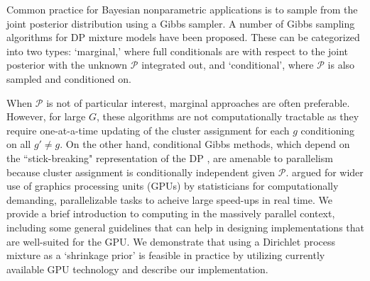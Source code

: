 Common practice for Bayesian nonparametric applications is to sample from the joint posterior distribution using a Gibbs sampler. A number of Gibbs sampling algorithms for DP mixture models have been proposed. These can be categorized into two types: `marginal,' where full conditionals are with respect to the joint posterior with the unknown $\mathcal{P}$ integrated out, and `conditional', where $\mathcal{P}$ is also sampled and conditioned on.

When $\mathcal{P}$ is not of particular interest, marginal approaches are often preferable. However, for large $G$, these algorithms are not computationally tractable as they require one-at-a-time updating of the cluster assignment for each $g$ conditioning on all $g'\neq g$. On the other hand, conditional Gibbs methods, which depend on the ``stick-breaking" representation of the DP \citet{sethuraman}, are amenable to parallelism because cluster assignment is conditionally independent given $\mathcal{P}$. \citet{suchard} argued for wider use of graphics processing units (GPUs) by statisticians for computationally demanding, parallelizable tasks to acheive large speed-ups in real time. We provide a brief introduction to computing in the massively parallel context, including some general guidelines that can help in designing implementations that are well-suited for the GPU. We demonstrate that using a Dirichlet process mixture as a `shrinkage prior' is feasible in practice by utilizing currently available GPU technology and describe our implementation.

